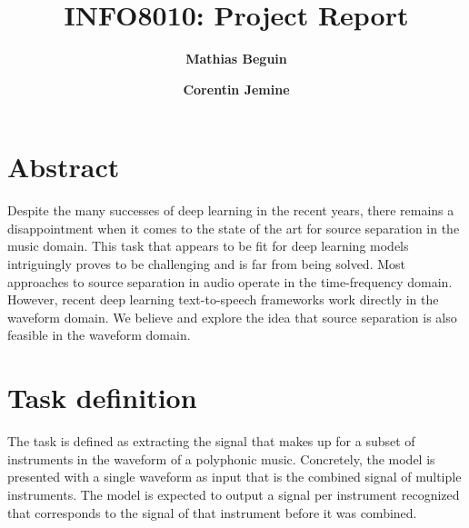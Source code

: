 \documentclass[twocolumn,superscriptaddress,aps]{revtex4-1}
\begin{document}

\title{\Large{INFO8010: Project Report}}
\vspace{1cm}
\author{\small{\bf Mathias Beguin}}
\author{\small{\bf Corentin Jemine}}

\maketitle


\section{Abstract}
Despite the many successes of deep learning in the recent years, there remains a disappointment when it comes to the state of the art for source separation in the music domain. This task that appears to be fit for deep learning models intriguingly proves to be challenging and is far from being solved. Most approaches to source separation in audio operate in the time-frequency domain. However, recent deep learning text-to-speech frameworks work directly in the waveform domain. We believe and explore the idea that source separation is also feasible in the waveform domain.


\section{Task definition}
The task is defined as extracting the signal that makes up for a subset of instruments in the waveform of a polyphonic music. Concretely, the model is presented with a single waveform as input that is the combined signal of multiple instruments. The model is expected to output a signal per instrument recognized that corresponds to the signal of that instrument before it was combined.
\end{document}
